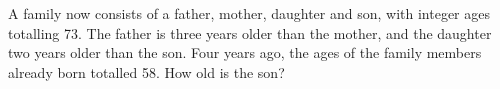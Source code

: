 A family now consists of a father, mother, daughter and son, with integer ages totalling 73. The father is three years older than the mother, and the daughter two years older than the son. Four years ago, the ages of the family members already born totalled 58. How old is the son?
